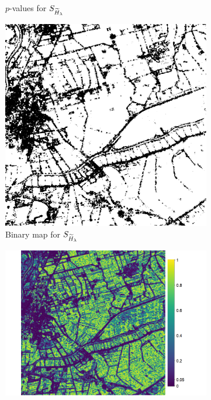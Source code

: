 \documentclass[
  journal,
]{IEEEtran}%
\begin{document}
\begin{figure}[hbt]
\begin{subfigure}{0.23\textwidth}
        \caption{$p$-values for $\small{S_{\widetilde{H}_{\lambda}}}$}
        \label{fig:2b}
    \end{subfigure}
    \begin{subfigure}{0.16\textwidth}
        \includegraphics[width=\linewidth]{./Figures/H_005_munich_renyi.png}
        \caption{Binary map for $\small{S_{\widetilde{H}_{\lambda}}}$}
        \label{fig:2c}
    \end{subfigure}
    \begin{subfigure}{0.23\textwidth}
        \includegraphics[width=\linewidth]{./Figures/H_pvalue_muni_Shan22.png}

\end{subfigure}
\end{figure}
\end{document}
